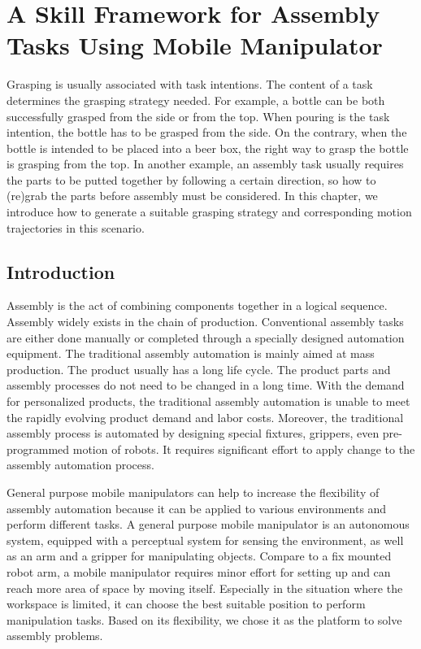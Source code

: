 \chapter{A Skill Framework for Assembly Tasks Using Mobile Manipulator} 
\label{chapter4}
Grasping is usually associated with task intentions. The content of a task determines the grasping strategy needed.  For example, a bottle can be both successfully grasped from the side or from the top. When pouring is the task intention, the bottle has to be grasped from the side.  On the contrary, when the bottle is intended to be placed into a beer box, the right way to grasp the bottle is grasping from the top. In another example, an assembly task usually requires the parts to be putted together by following a certain direction, so how to (re)grab the parts before assembly must be considered. In this chapter, we introduce how to generate a suitable grasping strategy and corresponding motion trajectories in this scenario.

\section{Introduction}
Assembly is the act of combining components together in a logical sequence. Assembly widely exists in the chain of production. Conventional assembly tasks are either done manually or completed through a specially designed automation equipment. The traditional assembly automation is mainly aimed at mass production. The product usually has a long life cycle. The product parts and assembly processes do not need to be changed in a long time.  With the demand for personalized products, the traditional assembly automation is unable to meet the rapidly evolving product demand and labor costs. Moreover, the traditional assembly process is automated by designing special fixtures, grippers, even pre-programmed motion of robots. It requires significant effort to apply change to the assembly automation process. 

General purpose mobile manipulators can help to increase the flexibility of assembly automation because it can be applied to various environments and perform different tasks. A general purpose mobile manipulator is an autonomous system, equipped with a perceptual system for sensing the environment, as well as an arm and a gripper for manipulating objects. Compare to a fix mounted robot arm, a mobile manipulator requires minor effort for setting up and can reach more area of space by moving itself. Especially in the situation where the workspace is limited, it can choose the best suitable position to perform manipulation tasks. Based on its flexibility, we chose it as the platform to solve assembly problems.

